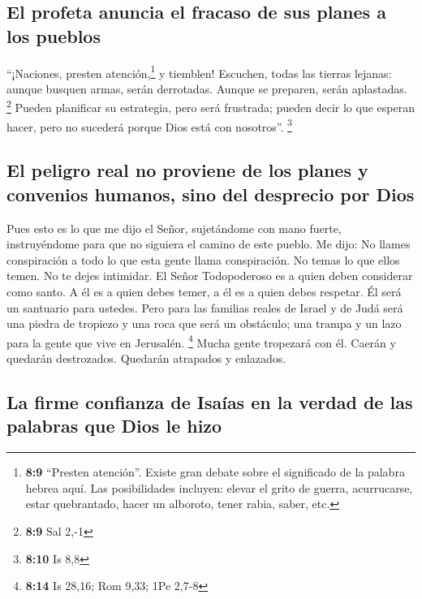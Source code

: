 \hypertarget{el-profeta-anuncia-el-fracaso-de-sus-planes-a-los-pueblos}{%
\subsection{El profeta anuncia el fracaso de sus planes a los
pueblos}\label{el-profeta-anuncia-el-fracaso-de-sus-planes-a-los-pueblos}}

 ``¡Naciones, presten atención,\footnote{\textbf{8:9}
  ``Presten atención''. Existe gran debate sobre el significado de la
  palabra hebrea aquí. Las posibilidades incluyen: elevar el grito de
  guerra, acurrucarse, estar quebrantado, hacer un alboroto, tener
  rabia, saber, etc.} y tiemblen! Escuchen, todas las tierras lejanas:
aunque busquen armas, serán derrotadas. Aunque se preparen, serán
aplastadas. \footnote{\textbf{8:9} Sal 2,-1}  Pueden
planificar su estrategia, pero será frustrada; pueden decir lo que
esperan hacer, pero no sucederá porque Dios está con nosotros''.
\footnote{\textbf{8:10} Is 8,8}

\hypertarget{el-peligro-real-no-proviene-de-los-planes-y-convenios-humanos-sino-del-desprecio-por-dios}{%
\subsection{El peligro real no proviene de los planes y convenios
humanos, sino del desprecio por
Dios}\label{el-peligro-real-no-proviene-de-los-planes-y-convenios-humanos-sino-del-desprecio-por-dios}}

 Pues esto es lo que me dijo el Señor, sujetándome con
mano fuerte, instruyéndome para que no siguiera el camino de este
pueblo. Me dijo:  No llames conspiración a todo lo que
esta gente llama conspiración. No temas lo que ellos temen. No te dejes
intimidar.  El Señor Todopoderoso es a quien deben
considerar como santo. A él es a quien debes temer, a él es a quien
debes respetar.  Él será un santuario para ustedes. Pero
para las familias reales de Israel y de Judá será una piedra de tropiezo
y una roca que será un obstáculo; una trampa y un lazo para la gente que
vive en Jerusalén. \footnote{\textbf{8:14} Is 28,16; Rom 9,33; 1Pe 2,7-8}
 Mucha gente tropezará con él. Caerán y quedarán
destrozados. Quedarán atrapados y enlazados.

\hypertarget{la-firme-confianza-de-isauxedas-en-la-verdad-de-las-palabras-que-dios-le-hizo}{%
\subsection{La firme confianza de Isaías en la verdad de las palabras
que Dios le
hizo}\label{la-firme-confianza-de-isauxedas-en-la-verdad-de-las-palabras-que-dios-le-hizo}}

